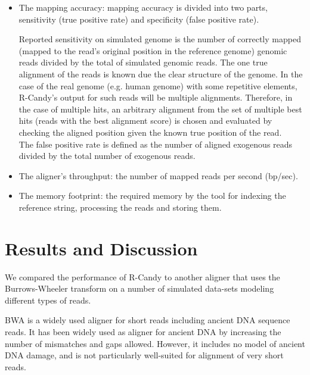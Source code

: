\documentclass[11pt,a4paper]{report}
\begin{document}
\begin{itemize}

 \item The mapping accuracy: mapping accuracy is divided into two parts, 
 sensitivity (true positive rate) and specificity (false positive rate).

Reported sensitivity on simulated genome is the number of correctly mapped
(mapped to the read's original position in the reference genome) genomic reads 
divided by the total of simulated genomic reads. The one true alignment of the
reads is known due the clear structure of the genome. In the case of the real 
genome (e.g. human genome) with some repetitive elements, R-Candy's output for 
such reads will be multiple alignments. Therefore, in the case of multiple hits, 
an arbitrary alignment from the set of multiple best hits (reads with the best 
alignment score) is chosen and evaluated by checking the aligned position given 
the known true position of the read.\\

The false positive rate is defined as the number of aligned exogenous reads 
divided by the total number of exogenous reads.

 \item The aligner's throughput: the number of mapped reads per second (bp/sec).

 \item The memory footprint: the required memory by the tool for indexing the 
reference string, processing the reads and storing them. 

\end{itemize}
 




\section{Results and Discussion} \label{Results and Discussion}

We compared the performance of R-Candy to another aligner that uses the 
Burrows-Wheeler transform\cite{bwa} on a number of simulated data-sets modeling 
different types of reads. 

BWA is a widely used aligner for short reads including ancient DNA sequence 
reads. It has been widely used as aligner for ancient DNA by increasing the 
number of mismatches and gaps allowed. However, it includes no model of ancient 
DNA damage, and is not particularly well-suited for alignment of very short reads.
\end{document}
